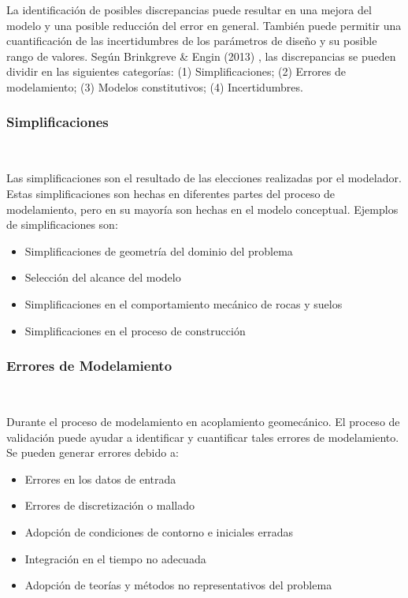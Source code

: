 La identificación de posibles discrepancias puede resultar en una mejora del modelo y una
posible reducción del error en general. También puede permitir una cuantificación de las incertidumbres de los parámetros de diseño y su posible rango de valores. Según Brinkgreve \& Engin (2013) \cite{R.B.J.2013ValidationAnalysis}, las discrepancias se pueden dividir en las siguientes categorías: (1) Simplificaciones; (2) Errores de modelamiento; (3) Modelos constitutivos; (4) Incertidumbres.

\subsubsection{Simplificaciones}~\hypertarget{sec:sec2341}{}
\label{sec:sec2341}

Las simplificaciones son el resultado de las elecciones realizadas por el modelador. Estas simplificaciones son hechas en diferentes partes del proceso de modelamiento, pero en su mayoría son hechas en el modelo conceptual. Ejemplos de simplificaciones son:

\begin{itemize}
    \item Simplificaciones de geometría del dominio del problema
    \item Selección del alcance del modelo
    \item Simplificaciones en el comportamiento mecánico de rocas y suelos
    \item Simplificaciones en el proceso de construcción
\end{itemize}


\subsubsection{Errores de Modelamiento}~\hypertarget{sec:sec2342}{}
\label{sec:sec2342}

Durante el proceso de modelamiento en acoplamiento geomecánico. El proceso de validación puede ayudar a identificar y cuantificar tales errores de modelamiento. Se pueden generar errores debido a:

\begin{itemize}
    \item Errores en los datos de entrada
    \item Errores de discretización o mallado
    \item Adopción de condiciones de contorno e iniciales erradas
    \item Integración en el tiempo no adecuada
    \item Adopción de teorías y métodos no representativos del problema
\end{itemize}

